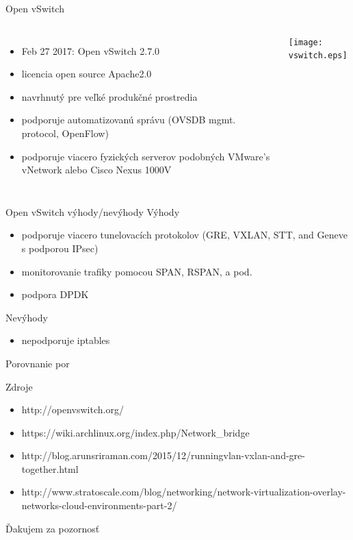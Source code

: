 \documentclass{beamer}
\begin{document}
	\begin{frame}{Open vSwitch}


		\begin{columns}

				\begin{itemize}
					\item{Feb 27 2017: Open vSwitch 2.7.0}
					\item{licencia open source Apache2.0}
					\item{navrhnutý pre veľké produkčné prostredia}
					\item{podporuje automatizovanú správu (OVSDB mgmt. protocol, OpenFlow)}
					\item{podporuje viacero fyzických serverov podobných VMware's vNetwork alebo Cisco Nexus 1000V}
				\end{itemize}
		

				\texttt{[image: vswitch.eps]}	
		\end{columns}


	\end{frame}

	\begin{frame}{Open vSwitch výhody/nevýhody}
		Výhody
		\begin{itemize}
			\item{podporuje viacero tunelovacích protokolov (GRE, VXLAN, STT, and Geneve s podporou IPsec)}
			\item{monitorovanie trafiky pomocou SPAN, RSPAN, a pod.}
			\item{podpora DPDK}
		\end{itemize}
		
		Nevýhody
		\begin{itemize}
			\item{nepodporuje iptables}		
		\end{itemize}
	\end{frame}

	\begin{frame}{Porovnanie}
		por
	\end{frame}

	\begin{frame}{Zdroje}
		\begin{itemize}
			\item{http://openvswitch.org/}
			\item{https://wiki.archlinux.org/index.php/Network\_bridge}
			\item{http://blog.arunsriraman.com/2015/12/running\-vlan-vxlan-and-gre-together.html}
			\item{http://www.stratoscale.com/blog/networking/network-virtualization-overlay-networks-cloud-environments-part-2/}
		\end{itemize}
	\end{frame}
	
	\begin{frame}
	\begin{center}
		Ďakujem za pozornosť
	\end{center}
	\end{frame}
\end{document}

